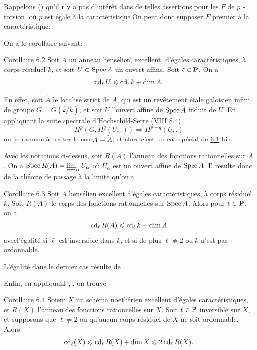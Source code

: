 \documentclass[10pt]{../fichiers-configuration-latex/smfart}
\begin{document}
Rappelons () qu'il n'y a pas d'intérêt dans de telles assertions
pour les $F$ de $p$ -torsion, où $p$ est égale à la
caractéristique.\pageoriginale On peut donc supposer $F$ premier à la
caractéristique.

On a le corollaire suivant:

\begin{enonce*}{Corollaire 6.2}
Soit $A$ un anneau hensélien, excellent, d'égales caractéristiques, à
corps résiduel $k$, et soit $U\subset \operatorname{Spec} A$ un ouvert affine. Soit
$\ell \in \mathbf{P}$. On a
$$
\operatorname{cd}_{\ell}U\leqslant \operatorname{cd}_{\ell}k+\dim A{}.
$$
\end{enonce*}

En effet, soit $\widetilde{A}$ le localisé strict de $A$, qui est un
revêtement étale galoisien infini, de groupe $G=G(\bar{k}/k)$, et soit
$\widetilde{U}$ l'ouvert affine de $\operatorname{Spec} \widetilde{A}$ induit de
$U$. En appliquant la suite spectrale d'Hochschild-Serre (VIII 8.4)
$$
H^{p}(G,H^{q}(U,.))\Longrightarrow H^{p+q}(U,.)
$$ 
on se ramène à traiter le cas $A=\widetilde{A}$, et alors c'est un cas
spécial de \hyperref[XIX.thm6.1]{6.1} bis.

Avec les notations ci-dessus, soit $R(A)$ l'anneau des fonctions
rationnelles sur $A$. On a $\operatorname{Spec} R(A)=\varprojlim_{\alpha}U_{\alpha}$
où $U_{\alpha}$ est un ouvert affine de $\operatorname{Spec} A$. Il résulte donc de
la théorie de passage à la limite qu'on a

\begin{enonce*}{Corollaire 6.3}
Soit $A$ hensélien excellent d'égales caractéristiques, à corps
résiduel $k$. Soit $R(A)$ le corps des fonctions rationnelles sur
$\operatorname{Spec} A$. Alors pour $\ell \in \mathbf{P}$, on a
$$
\operatorname{cd}_{\ell}R(A)\leqslant \operatorname{cd}_{\ell}k+\dim A
$$
avec\pageoriginale l'égalité si $\ell$ est inversible dans $k$, et si
de plus $\ell\neq 2$ ou $k$ n'est pas ordonnable.
\end{enonce*}

L'égalité dans le dernier cas résulte de .

Enfin, en appliquant , , on trouve

\begin{enonce*}{Corollaire 6.4}
Soient $X$ un schéma noethérien excellent d'égales caractéristiques,
et $R(X)$ l'anneau des fonctions rationnelles sur $X$. Soit $\ell\in
\mathbf{P}$ inversible sur $X$, et supposons que $\ell\neq 2$ ou
qu'aucun corps résiduel de $X$ ne soit ordonnable. Alors
$$
\operatorname{cd}_{\ell}(X)\leqslant \operatorname{cd}_{\ell}R(X)+\dim X\leqslant 2\operatorname{cd}_{\ell}R(X){}.
$$
\end{enonce*}
\end{document}
